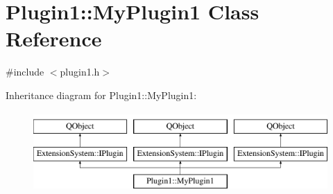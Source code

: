 \hypertarget{class_plugin1_1_1_my_plugin1}{\section{Plugin1\-:\-:My\-Plugin1 Class Reference}
\label{class_plugin1_1_1_my_plugin1}
}


{\ttfamily \#include $<$plugin1.\-h$>$}

Inheritance diagram for Plugin1\-:\-:My\-Plugin1\-:\begin{figure}[H]
\begin{center}
\leavevmode
\includegraphics[height=3.000000cm]{class_plugin1_1_1_my_plugin1}
\end{center}
\end{figure}
